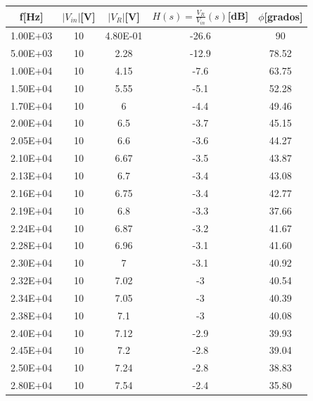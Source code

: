 \begin{table}[!htb]
\centering
\begin{tabular}{|c|c|c|c|c|}
\hline
f{[}Hz{]}    & $|V_{in}|${[}V{]} & $|V_R|${[}V{]}      & $H(s)=\frac{V_R}{V_{in}} (s)${[}dB{]} & $\phi${[}grados{]} \\ \hline
1.00E+03  & 10    & 4.80E-01 & -26.6           & 90                  \\ \hline
5.00E+03  & 10    & 2.28     & -12.9           & 78.52         \\ \hline
1.00E+04  & 10    & 4.15     & -7.6            & 63.75         \\ \hline
1.50E+04  & 10    & 5.55     & -5.1            & 52.28        \\ \hline
1.70E+04  & 10    & 6        & -4.4            & 49.46         \\ \hline
2.00E+04  & 10    & 6.5      & -3.7            & 45.15        \\ \hline
2.05E+04  & 10    & 6.6      & -3.6            & 44.27         \\ \hline
2.10E+04  & 10    & 6.67     & -3.5            & 43.87        \\ \hline
2.13E+04  & 10    & 6.7      & -3.4            & 43.08         \\ \hline
2.16E+04  & 10    & 6.75     & -3.4            & 42.77         \\ \hline
2.19E+04  & 10    & 6.8      & -3.3            & 37.66        \\ \hline
2.24E+04  & 10    & 6.87     & -3.2            & 41.67       \\ \hline
2.28E+04  & 10    & 6.96     & -3.1            & 41.60        \\ \hline
2.30E+04  & 10    & 7        & -3.1            & 40.92        \\ \hline
2.32E+04  & 10    & 7.02     & -3              & 40.54         \\ \hline
2.34E+04  & 10    & 7.05     & -3              & 40.39        \\ \hline
2.38E+04  & 10    & 7.1      & -3              & 40.08         \\ \hline
2.40E+04  & 10    & 7.12     & -2.9            & 39.93         \\ \hline
2.45E+04  & 10    & 7.2      & -2.8            & 39.04         \\ \hline
2.50E+04  & 10    & 7.24     & -2.8            & 38.83         \\ \hline
2.80E+04  & 10    & 7.54     & -2.4            & 35.80         \\ \hline

\end{tabular}
\end{table}

